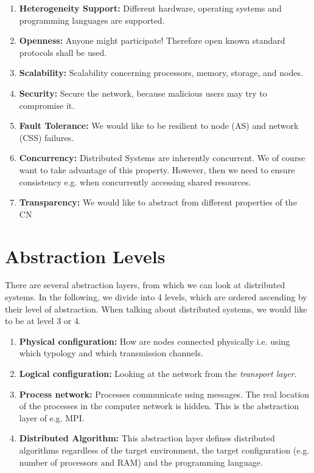 \begin{enumerate}
    \item \textbf{Heterogeneity Support:} Different hardware, operating systems and programming languages are supported.
    \item \textbf{Openness:} Anyone might participate! Therefore open known standard protocols shall be used.
    \item \textbf{Scalability:} Scalability concerning processors, memory, storage, and nodes.
    \item \textbf{Security:} Secure the network, because malicious users may try to compromise it.
    \item \textbf{Fault Tolerance:} We would like to be resilient to node (\ac{AS}) and network (\ac{CSS}) failures.
    \item \textbf{Concurrency:} Distributed Systems are inherently concurrent. We of course want to take advantage of this property. However, then we need to ensure consistency e.g. when concurrently accessing shared resources.
    \item \textbf{Transparency:} We would like to abstract from different properties of the \ac{CN}
\end{enumerate}

\section{Abstraction Levels}

There are several abstraction layers, from which we can look at distributed systems. In the following, we divide into 4 levels, which are ordered ascending by their level of abstraction. When talking about distributed systems, we would like to be at level 3 or 4.

\begin{enumerate}
    \item \textbf{Physical configuration:} How are nodes connected physically i.e. using which typology and which transmission channels.
    \item \textbf{Logical configuration:} Looking at the network from the \textit{transport layer}.
    \item \textbf{Process network:} Processes communicate using messages. The real location of the processes in the computer network is hidden. This is the abstraction layer of e.g. MPI.
    \item \textbf{Distributed Algorithm:} This abstraction layer defines distributed algorithms regardless of the target environment, the target configuration (e.g. number of processors and RAM) and the programming language.
\end{enumerate}

